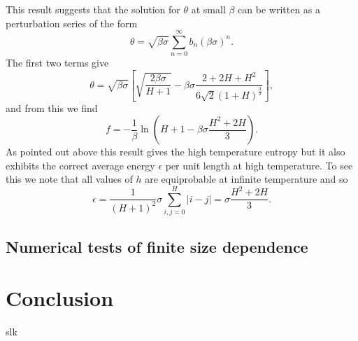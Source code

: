 This result suggests that the solution for $\theta$ at small $\beta$ can be written as a perturbation series of the form
\begin{equation}
    \theta = \sqrt{\beta\sigma}\sum_{n=0}^\infty b_n (\beta\sigma)^n.
\end{equation}
The first two terms give
\begin{equation}
    \theta = \sqrt{\beta\sigma}\left[\sqrt{\frac{2\beta\sigma}{H+1}} -\beta\sigma \frac{2 + 2H +H^2}{6\sqrt{2}(1+H)^{\frac{3}{2}}}\right],
\end{equation}
and from this we find
\begin{equation}
    f=-\frac{1}{\beta}\ln(H+1-\beta\sigma\frac{H^2+2H}{3}).
\end{equation}
As pointed out above this result gives the high temperature entropy but it also exhibits the correct average energy $\epsilon$ per unit length at high temperature. To see this we note that all values of $h$ are equiprobable at infinite temperature and so
\begin{equation}
    \epsilon = \frac{1}{(H+1)^2}\sigma \sum_{i,j=0}^H |i-j| =\sigma\frac{H^2+2H}{3}.
\end{equation}


\subsection{Numerical tests of finite size dependence}

   \section{Conclusion}

{\color{red}slk}   